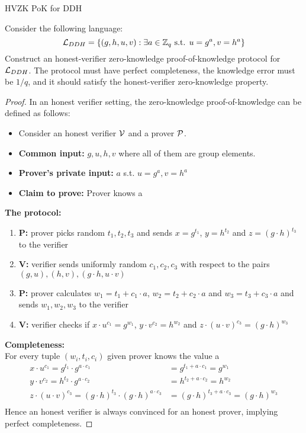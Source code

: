 \begin{solution}{HVZK PoK for DDH}\label{ques:21}
    \begin{question}
    Consider the following language:
    \begin{equation}
        \mathcal{L}_{DDH} = \{(g,h,u,v): \exists a \in \mathbb{Z}_q \text{ s.t. }u = g^a , v = h^a \}
    \end{equation}
    Construct an honest-verifier zero-knowledge proof-of-knowledge protocol for $\mathcal{L}_{DDH}$. The protocol must have perfect completeness, the knowledge error must be $1/q$, and it should satisfy the honest-verifier zero-knowledge property.
    \end{question}
    \tcblower{}
    \begin{proof}
    In an honest verifier setting, the zero-knowledge proof-of-knowledge can be defined as follows: 
    \begin{itemize}
        \item Consider an honest verifier $\mathcal{V}$ and a prover $\mathcal{P}$.
        \item \textbf{Common input:} $g, u, h, v$ where all of them are group elements.
        \item \textbf{Prover's private input:} $a$ s.t. $u = g^a , v = h^a$
        \item \textbf{Claim to prove:} Prover knows a
    \end{itemize}

    \textbf{The protocol:}
    \begin{enumerate}
        \item \textbf{P:} prover picks random $t_1, t_2, t_3$ and sends $x = g^{t_1}$, $y = h^{t_2}$ and $z = (g \cdot h)^{t_3}$ to the verifier
        \item \textbf{V:} verifier sends uniformly random $c_1, c_2, c_3$ with respect to the pairs $(g,u),(h,v),(g \cdot h,u \cdot v)$
        \item \textbf{P:} prover calculates $w_1 = t_1 +c_1\cdot a$, $w_2 = t_2 +c_2\cdot a$ and $w_3 = t_3 +c_3\cdot a$ and sends $w_1, w_2, w_3$ to the verifier
        \item \textbf{V:} verifier checks if $x \cdot u^{c_1} = g^{w_1}$, $y \cdot v^{c_2} = h^{w_2}$ and $z \cdot (u \cdot v)^{c_3} = (g \cdot h)^{w_3}$
    \end{enumerate}

    \textbf{Completeness:}\\
    For every tuple $(w_i,t_i,c_i)$ given prover knows the value a
    \begin{equation}
    \begin{split}
            x\cdot u^{c_1} = g^{t_1}\cdot g^{a\cdot c_1} &= g^{t_1+a\cdot c_1} = g^{w_1}\\
            y\cdot v^{c_2} = h^{t_2}\cdot g^{a\cdot c_2} &= h^{t_2+a\cdot c_2} = h^{w_2}\\
            z\cdot (u\cdot v)^{c_3} = (g\cdot h)^{t_3}\cdot (g\cdot h)^{a\cdot c_3} &= (g\cdot h)^{t_3+a\cdot c_3} = (g\cdot h)^{w_3}\\   
    \end{split}
    \end{equation}
    Hence an honest verifier is always convinced for an honest prover, implying perfect completeness.


\end{proof}
\end{solution}
